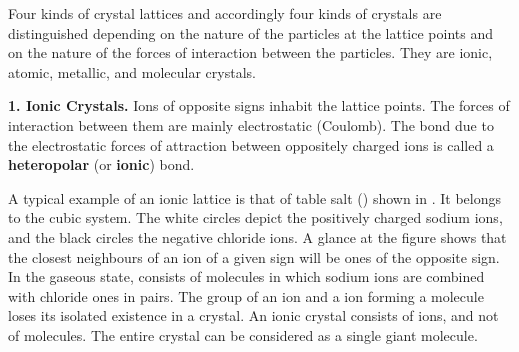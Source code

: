 Four kinds of crystal lattices and accordingly four kinds of crystals are distinguished depending on the nature of the particles at the lattice points and on the nature of the forces of interaction between the particles. They are ionic, atomic, metallic, and molecular crystals.

\textbf{1. Ionic Crystals.} Ions of opposite signs inhabit the lattice points. The forces of interaction between them are mainly electrostatic (Coulomb). The bond due to the electrostatic forces of attraction between oppositely charged ions is called a \textbf{heteropolar} (or \textbf{ionic}) bond.

A typical example of an ionic lattice is that of table salt () shown in . It belongs to the cubic system. The white circles depict the positively charged sodium ions, and the black circles the negative chloride ions. A glance at the figure shows that the closest neighbours of an ion of a given sign will be ones of the opposite sign. In the gaseous state,  consists of molecules in which sodium ions are combined with chloride ones in pairs. The group of an  ion and a  ion forming a molecule loses its isolated existence in a crystal. An ionic crystal consists of ions, and not of molecules. The entire crystal can be considered as a single giant molecule.

